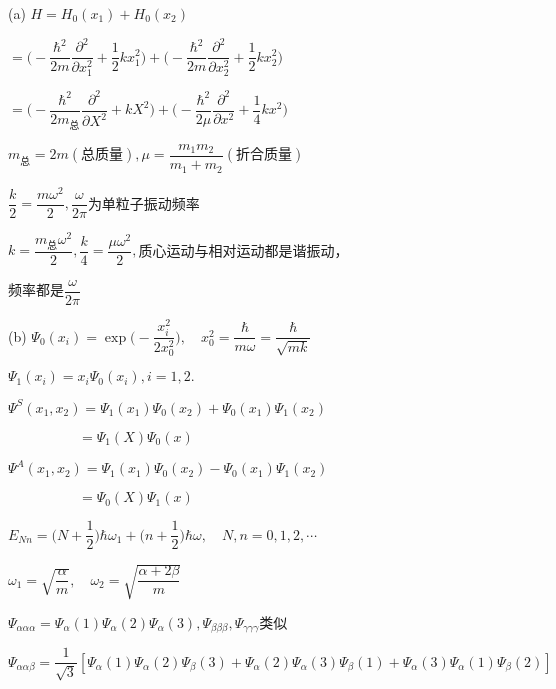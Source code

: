 \achapter


\answer (a) $ H=H_{0}(x_{1})+H_{0}(x_{2}) $

\aindent 	$ =\bigg(-\dfrac{\hbar^{2}}{2m}\dfrac{\partial^{2}}{\partial x_{1}^{2}}+\dfrac{1}{2}kx_{1}^{2}\bigg)+\bigg(-\dfrac{\hbar^{2}}{2m}\dfrac{\partial^{2}}{\partial x_{2}^{2}}+\dfrac{1}{2}kx_{2}^{2}\bigg) $

\aindent 	$ =\bigg(-\dfrac{\hbar^{2}}{2m_{\text{总}}}\dfrac{\partial^{2}}{\partial X^{2}}+kX^{2}\bigg)+\bigg(-\dfrac{\hbar^{2}}{2\mu}\dfrac{\partial^{2}}{\partial x^{2}}+\dfrac{1}{4}kx^{2}\bigg) $

\aindent 	$ m_{\text{总}}=2m(\text{总质量}),\mu=\dfrac{m_{1}m_{2}}{m_{1}+m_{2}}(\text{折合质量}) $

\aindent 	$ \dfrac{k}{2}=\dfrac{m\omega^{2}}{2},\dfrac{\omega}{2\pi}$为单粒子振动频率

\aindent 	$ k=\dfrac{m_{\text{总}}\omega^{2}}{2},\dfrac{k}{4}=\dfrac{\mu\omega^{2}}{2},$质心运动与相对运动都是谐振动，

\aindent	频率都是$\dfrac{\omega}{2\pi}$

		(b) $ \varPsi_{0}(x_{i})=\exp\bigg(-\dfrac{x_{i}^{2}}{2x_{0}^{2}}\bigg),\quad x_{0}^{2}=\dfrac{\hbar}{m\omega}=\dfrac{\hbar}{\sqrt{mk}} $

\aindent 	$ \varPsi_{1}(x_{i})=x_{i}\varPsi_{0}(x_{i}),i=1,2. $

\aindent 	$ \varPsi^{S}(x_{1},x_{2})=\varPsi_{1}(x_{1})\varPsi_{0}(x_{2})+\varPsi_{0}(x_{1})\varPsi_{1}(x_{2}) $

\aindent	$ \quad\qquad\qquad=\varPsi_{1}(X)\varPsi_{0}(x) $

\aindent 	$ \varPsi^{A}(x_{1},x_{2})=\varPsi_{1}(x_{1})\varPsi_{0}(x_{2})-\varPsi_{0}(x_{1})\varPsi_{1}(x_{2}) $

\aindent	$ \quad\qquad\qquad=\varPsi_{0}(X)\varPsi_{1}(x) $

\answer $ E_{Nn}=\bigg(N+\dfrac{1}{2}\bigg)\hbar\omega_{1}+\bigg(n+\dfrac{1}{2}\bigg)\hbar\omega,\quad N,n=0,1,2,\cdots $

		$ \omega_{1}=\sqrt{\dfrac{\alpha}{m}},\quad \omega_{2}=\sqrt{\dfrac{\alpha+2\beta}{m}} $

\answer $ \Psi_{\alpha\alpha\alpha}=\varPsi_{\alpha}(1)\varPsi_{\alpha}(2)\varPsi_{\alpha}(3),\Psi_{\beta\beta\beta},\Psi_{\gamma\gamma\gamma}$类似

		$ \Psi_{\alpha\alpha\beta}=\dfrac{1}{\sqrt{3}}[\varPsi_{\alpha}(1)\varPsi_{\alpha}(2)\varPsi_{\beta}(3)+\varPsi_{\alpha}(2)\varPsi_{\alpha}(3)\varPsi_{\beta}(1)+\varPsi_{\alpha}(3)\varPsi_{\alpha}(1)\varPsi_{\beta}(2)] $
		
